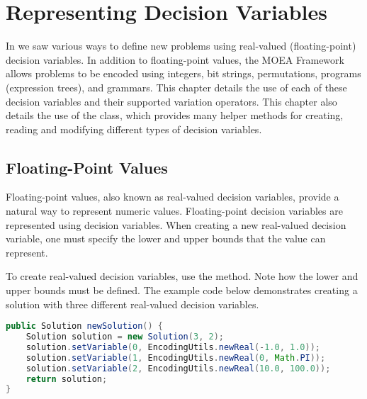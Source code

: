 %
%

\chapter{Representing Decision Variables}
\label{chpt:representations}

In  we saw various ways to define new problems using real-valued (floating-point) decision variables.  In addition to floating-point values, the MOEA Framework allows problems to be encoded using integers, bit strings, permutations, programs (expression trees), and grammars.  This chapter details the use of each of these decision variables and their supported variation operators.  This chapter also details the use of the  class, which provides many helper methods for creating, reading and modifying different types of decision variables.

\section{Floating-Point Values}
Floating-point values, also known as real-valued decision variables, provide a natural way to represent numeric values.  Floating-point decision variables are represented using  decision variables.  When creating a new real-valued decision variable, one must specify the lower and upper bounds that the value can represent.

To create real-valued decision variables, use the  method.  Note how the lower and upper bounds must be defined.  The example code below demonstrates creating a solution with three different real-valued decision variables.
\begin{lstlisting}[language=Java]
public Solution newSolution() {
    Solution solution = new Solution(3, 2);
    solution.setVariable(0, EncodingUtils.newReal(-1.0, 1.0));
    solution.setVariable(1, EncodingUtils.newReal(0, Math.PI));
    solution.setVariable(2, EncodingUtils.newReal(10.0, 100.0));
    return solution;
}
\end{lstlisting}

